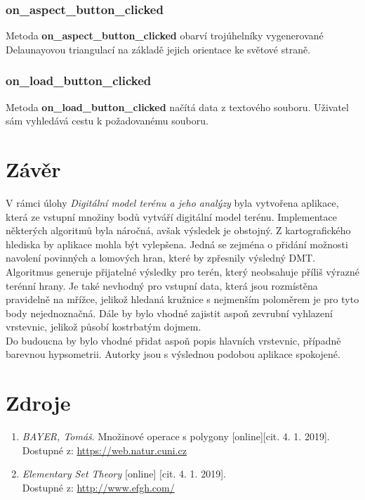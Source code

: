 \documentclass[a4paper, 12pt]{article}
\begin{document}
\subsubsection*{on\_aspect\_button\_clicked}
Metoda \textbf{on\_aspect\_button\_clicked} obarví trojúhelníky vygenerované Delaunayovou triangulací na základě jejich orientace ke světové straně.

\subsubsection*{on\_load\_button\_clicked}
Metoda \textbf{on\_load\_button\_clicked} načítá data z textového souboru. Uživatel sám vyhledává cestu k požadovanému souboru.

\clearpage
\section{Závěr}
V rámci úlohy \textit{Digitální model terénu a jeho analýzy} byla vytvořena aplikace, která ze vstupní množiny bodů vytváří digitální model terénu. Implementace některých algoritmů byla náročná, avšak výsledek je obstojný. Z kartografického hlediska by aplikace mohla být  vylepšena. Jedná se zejména o přidání možnosti navolení povinných a lomových hran, které by zpřesnily výsledný DMT. Algoritmus generuje přijatelné výsledky pro terén, který neobsahuje příliš výrazné terénní hrany. Je také nevhodný pro vstupní data, která jsou rozmístěna pravidelně na mřížce, jelikož hledaná kružnice s nejmenším poloměrem je pro tyto body nejednoznačná. Dále by bylo vhodné zajistit aspoň zevrubní vyhlazení vrstevnic, jelikož působí kostrbatým dojmem. \\

Do budoucna by bylo vhodné přidat aspoň popis hlavních vrstevnic, případně barevnou hypsometrii. Autorky jsou s výslednou podobou aplikace spokojené. 
\clearpage

\section{Zdroje}
\begin{enumerate}
\item  \textsl{BAYER, Tomáš}. Množinové operace s polygony [online][cit. 4. 1. 2019].\\
Dostupné z: \href{https://web.natur.cuni.cz/~bayertom/images/courses/Adk/adk9.pdf}{https://web.natur.cuni.cz}

\item  \textsl{Elementary Set Theory} [online] [cit. 4. 1. 2019].\\
Dostupné z: \href{http://www.efgh.com/math/algebra/sets.htm}{http://www.efgh.com/}
\end{enumerate}
\end{document}
